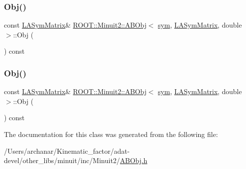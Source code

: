 \mbox{\label{classROOT_1_1Minuit2_1_1ABObj_3_01sym_00_01LASymMatrix_00_01double_01_4_a8caec6ce565f8d3729c663088d40233e}} 
\subsubsection{\texorpdfstring{Obj()}{Obj()}\hspace{0.1cm}{\footnotesize\ttfamily [2/3]}}
{\footnotesize\ttfamily const \mbox{\hyperlink{classROOT_1_1Minuit2_1_1LASymMatrix}{L\+A\+Sym\+Matrix}}\& \mbox{\hyperlink{classROOT_1_1Minuit2_1_1ABObj}{R\+O\+O\+T\+::\+Minuit2\+::\+A\+B\+Obj}}$<$ \mbox{\hyperlink{classROOT_1_1Minuit2_1_1sym}{sym}}, \mbox{\hyperlink{classROOT_1_1Minuit2_1_1LASymMatrix}{L\+A\+Sym\+Matrix}}, double $>$\+::Obj (\begin{DoxyParamCaption}{ }\end{DoxyParamCaption}) const\hspace{0.3cm}{\ttfamily [inline]}}

\mbox{\label{classROOT_1_1Minuit2_1_1ABObj_3_01sym_00_01LASymMatrix_00_01double_01_4_a8caec6ce565f8d3729c663088d40233e}} 
\subsubsection{\texorpdfstring{Obj()}{Obj()}\hspace{0.1cm}{\footnotesize\ttfamily [3/3]}}
{\footnotesize\ttfamily const \mbox{\hyperlink{classROOT_1_1Minuit2_1_1LASymMatrix}{L\+A\+Sym\+Matrix}}\& \mbox{\hyperlink{classROOT_1_1Minuit2_1_1ABObj}{R\+O\+O\+T\+::\+Minuit2\+::\+A\+B\+Obj}}$<$ \mbox{\hyperlink{classROOT_1_1Minuit2_1_1sym}{sym}}, \mbox{\hyperlink{classROOT_1_1Minuit2_1_1LASymMatrix}{L\+A\+Sym\+Matrix}}, double $>$\+::Obj (\begin{DoxyParamCaption}{ }\end{DoxyParamCaption}) const\hspace{0.3cm}{\ttfamily [inline]}}



The documentation for this class was generated from the following file\+:\begin{DoxyCompactItemize}
\item 
/\+Users/archanar/\+Kinematic\+\_\+factor/adat-\/devel/other\+\_\+libs/minuit/inc/\+Minuit2/\mbox{\hyperlink{adat-devel_2other__libs_2minuit_2inc_2Minuit2_2ABObj_8h}{A\+B\+Obj.\+h}}\end{DoxyCompactItemize}
